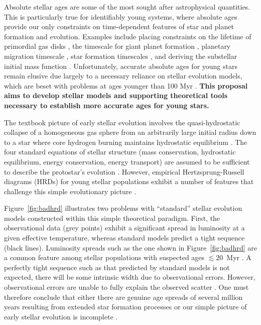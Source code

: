 %
%

Absolute stellar ages are some of the most sought after astrophysical quantities. This is particularly true for identifiably young systems, where absolute ages provide our only constraints on time-dependent features of star and planet formation and evolution. Examples include placing constraints on the lifetime of primordial gas disks \citep[e.g.,][]{Haisch2001, Mamajek2009}, the timescale for giant planet formation \citep{Chabrier2014}, planetary migration timescale \citep{Ward1997, DAngelo2002}, star formation timescales \citep[e.g.,][]{Kenyon1995, Hillenbrand1997, Elmegreen2000}, and deriving the substellar initial mass function \citep{Chabrier2003}. Unfortunately, accurate absolute ages for young stars remain elusive \citep{Soderblom2014} due largely to a necessary reliance on stellar evolution models, which are beset with problems at ages younger than 100 Myr \citep[e.g.,][]{Mathieu2007, Stassun2014}. {\bf This proposal aims to develop stellar models and supporting theoretical tools necessary to establish more accurate ages for young stars.}

The textbook picture of early stellar evolution involves the quasi-hydrostatic collapse of a homogeneous gas sphere from an arbitrarily large initial radius down to a star where core hydrogen burning maintains hydrostatic equilibrium \citep[e.g.,][]{Henyey1955, Hayashi1961, Iben1965}. The four standard equations of stellar structure (mass conservation, hydrostatic equilibrium, energy conservation, energy transport) are assumed to be sufficient to describe the protostar's evolution \citep{Iben1965, Bodenheimer1965}. However, 
empirical Hertzsprung-Russell diagrams (HRDs) for young stellar populations exhibit a number of features that challenge this simple evolutionary picture \citep[e.g.,][]{Hillenbrand1997, Naylor2009, DaRio2010a, Herczeg2015}. 

Figure~\ref{fig:badhrd} illustrates two problems with ``standard'' stellar evolution models constructed within this simple theoretical paradigm. First, the observational data (grey points) exhibit a significant spread in luminosity at a given effective temperature, whereas standard models predict a tight sequence (black lines). Luminosity spreads such as the one shown in Figure~\ref{fig:badhrd} are a common feature among stellar populations with suspected ages $\lesssim 20$~Myr \citep{Hillenbrand1997, Hartmann2001, DaRio2010a}. A perfectly tight sequence such as that predicted by standard models is not expected, there will be some intrinsic width due to observational errors. However, observational errors are unable to fully explain the observed scatter \citep[e.g.,][]{Jeffries2012, Pecaut2012}. One must therefore conclude that either there are genuine age spreads of several million years resulting from extended star formation processes or our simple picture of early stellar evolution is incomplete \citep{Jeffries2012, Soderblom2014}.

